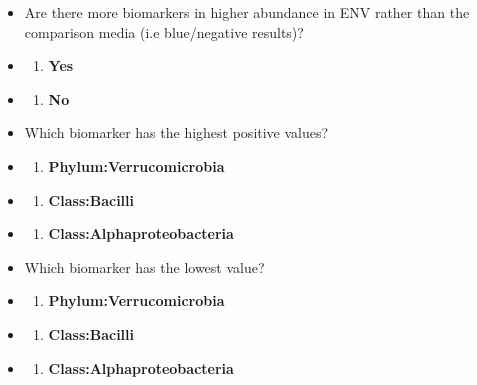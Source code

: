 \documentclass[
]{book}
\providecommand{\tightlist}{%
  \setlength{\itemsep}{0pt}\setlength{\parskip}{0pt}}
\begin{document}
\begin{itemize}
\item
  Are there more biomarkers in higher abundance in ENV rather than the comparison media (i.e blue/negative results)?
\item
  \begin{enumerate}
  \def\labelenumi{(\Alph{enumi})}
  \tightlist
  \item
    \textbf{Yes}\\
  \end{enumerate}
\item
  \begin{enumerate}
  \def\labelenumi{(\Alph{enumi})}
  \setcounter{enumi}{1}
  \tightlist
  \item
    \textbf{No}
  \end{enumerate}
\item
  Which biomarker has the highest positive values?
\item
  \begin{enumerate}
  \def\labelenumi{(\Alph{enumi})}
  \tightlist
  \item
    \textbf{Phylum:Verrucomicrobia}\\
  \end{enumerate}
\item
  \begin{enumerate}
  \def\labelenumi{(\Alph{enumi})}
  \setcounter{enumi}{1}
  \tightlist
  \item
    \textbf{Class:Bacilli}\\
  \end{enumerate}
\item
  \begin{enumerate}
  \def\labelenumi{(\Alph{enumi})}
  \setcounter{enumi}{2}
  \tightlist
  \item
    \textbf{Class:Alphaproteobacteria}
  \end{enumerate}
\item
  Which biomarker has the lowest value?
\item
  \begin{enumerate}
  \def\labelenumi{(\Alph{enumi})}
  \tightlist
  \item
    \textbf{Phylum:Verrucomicrobia}\\
  \end{enumerate}
\item
  \begin{enumerate}
  \def\labelenumi{(\Alph{enumi})}
  \setcounter{enumi}{1}
  \tightlist
  \item
    \textbf{Class:Bacilli}\\
  \end{enumerate}
\item
  \begin{enumerate}
  \def\labelenumi{(\Alph{enumi})}
  \setcounter{enumi}{2}
  \tightlist
  \item
    \textbf{Class:Alphaproteobacteria}
  \end{enumerate}
\end{itemize}
\end{document}

